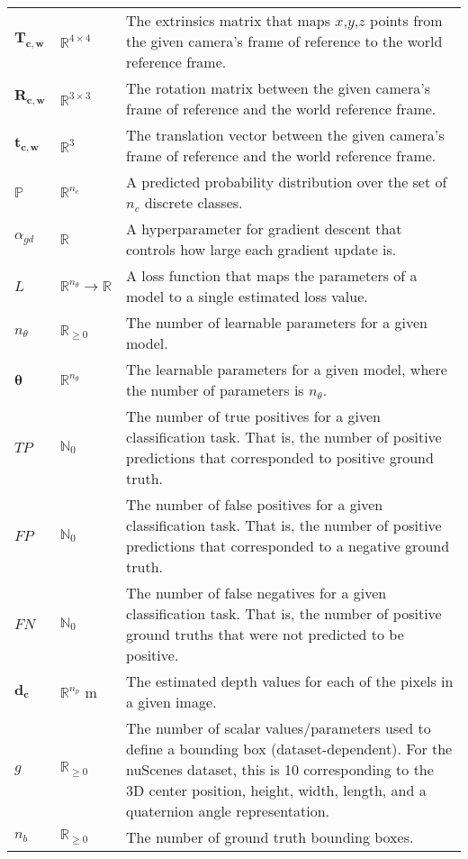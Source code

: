 \documentclass[12pt, titlepage]{article}
\begin{document}
\begin{longtable*}{l l p{12cm}}
\\
$\mathbf{T_{c,w}}$ & $\mathbb{R}^{4\times{}4}$ & The extrinsics matrix that maps $x$,$y$,$z$ points from the given camera's frame of reference to the world reference frame.
\\ 
$\mathbf{R_{c,w}}$ & $\mathbb{R}^{3\times3}$ & The rotation matrix between the given camera's frame of reference and the world reference frame.
\\
$\mathbf{t_{c,w}}$ & $\mathbb{R}^{3}$ & The translation vector between the given camera's frame of reference and the world reference frame.
\\
$\mathbb{P}$ & $\mathbb{R}^{n_c}$ & A predicted probability distribution over the set of $n_c$ discrete classes.
\\
$\alpha_{gd}$ & $\mathbb{R}$ & A hyperparameter for gradient descent that controls how large each gradient update is.
\\
$L$ & $\mathbb{R}^{n_\theta}\rightarrow\mathbb{R}$ & A loss function that maps the parameters of a model to a single estimated loss value.
\\
$n_{\theta}$ & $\mathbb{R}_{\geq0}$ & The number of learnable parameters for a given model.
\\
$\mathbf{\theta}$ & $\mathbb{R}^{n_\theta}$ & The learnable parameters for a given model, where the number of parameters is $n_\theta$.
\\
$\mathit{TP}$ & $\mathbb{N}_{0}$ & The number of true positives for a given classification task. That is, the number of positive predictions that corresponded to positive ground truth.
\\
$\mathit{FP}$ & $\mathbb{N}_{0}$ & The number of false positives for a given classification task. That is, the number of positive predictions that corresponded to a negative ground truth.
\\
$\mathit{FN}$ & $\mathbb{N}_{0}$ & The number of false negatives for a given classification task. That is, the number of positive ground truths that were not predicted to be positive.
\\
$\mathbf{d_{c}}$ & $\mathbb{R}^{n_p}$ m & The estimated depth values for each of the pixels in a given image.
\\
$g$ & $\mathbb{R}_{\geq0}$ & The number of scalar values/parameters used to define a bounding box (dataset-dependent). For the nuScenes dataset, this is 10 corresponding to the 3D center position, height, width, length, and a quaternion angle representation. 
\\
$n_{b}$ & $\mathbb{R}_{\geq0}$ & The number of ground truth bounding boxes. 

\end{longtable*}
\end{document}
